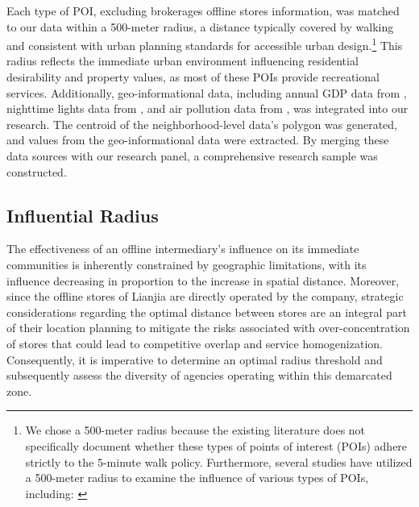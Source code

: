 \documentclass[11pt]{article}
\begin{document}
Each type of POI, excluding brokerages offline stores information, was matched to our data within a 500-meter radius, a distance typically covered by walking and consistent with urban planning standards for accessible urban design.\footnote{We chose a 500-meter radius because the existing literature does not specifically document whether these types of points of interest (POIs) adhere strictly to the 5-minute walk policy. Furthermore, several studies have utilized a 500-meter radius to examine the influence of various types of POIs, including: \citep{LI2019165, doi:10.1287/mnsc.2019.3550}} This radius reflects the immediate urban environment influencing residential desirability and property values, as most of these POIs provide recreational services. Additionally, geo-informational data, including annual GDP data from \citet{zhao_forecasting_2017}, nighttime lights data from \citet{elvidge_annual_2021}, and air pollution data from \citet{doi:10.1021/acs.est.1c05309}, was integrated into our research. The centroid of the neighborhood-level data's polygon was generated, and values from the geo-informational data were extracted. By merging these data sources with our research panel, a comprehensive research sample was constructed.

\subsection{Influential Radius} \label{subsec:Influential_Radius}

The effectiveness of an offline intermediary's influence on its immediate communities is inherently constrained by geographic limitations, with its influence decreasing in proportion to the increase in spatial distance. Moreover, since the offline stores of Lianjia are directly operated by the company, strategic considerations regarding the optimal distance between stores are an integral part of their location planning to mitigate the risks associated with over-concentration of stores that could lead to competitive overlap and service homogenization. Consequently, it is imperative to determine an optimal radius threshold and subsequently assess the diversity of agencies operating within this demarcated zone.
\end{document}
